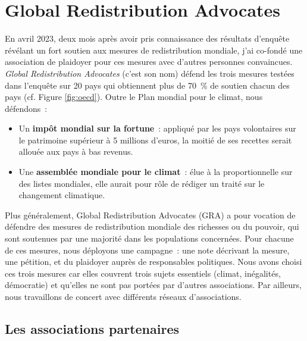 \documentclass[a5paper,french,openany]{memoir}
\begin{document}
\section{Global Redistribution Advocates}

En avril 2023, deux mois après avoir pris connaissance des résultats d'enquête révélant un fort soutien aux mesures de redistribution mondiale, j'ai co-fondé une association de plaidoyer pour ces mesures avec d'autres personnes convaincues. \textit{Global Redistribution Advocates} (c'est son nom) défend les trois mesures testées dans l'enquête sur 20 pays qui obtiennent plus de 70~\% de soutien chacun des pays (cf. Figure \ref{fig:oecd}). Outre le Plan mondial pour le climat, nous défendons~: 
\begin{itemize}
  \item Un \textbf{impôt mondial sur la fortune}~: appliqué par les pays volontaires sur le patrimoine supérieur à 5 millions d'euros, la moitié de ses recettes serait allouée aux pays à bas revenus.
  \item Une \textbf{assemblée mondiale pour le climat}~: élue à la proportionnelle sur des listes mondiales, elle aurait pour rôle de rédiger un traité sur le changement climatique.
\end{itemize}

Plus généralement, Global Redistribution Advocates (GRA) a pour vocation de défendre des mesures de redistribution mondiale des richesses ou du pouvoir, qui sont soutenues par une majorité dans les populations concernées. Pour chacune de ces mesures, nous déployons une campagne~: une note décrivant la mesure, une pétition, et du plaidoyer auprès de responsables politiques. Nous avons choisi ces trois mesures car elles couvrent trois sujets essentiels (climat, inégalités, démocratie) et qu'elles ne sont pas portées par d'autres associations. Par ailleurs, nous travaillons de concert avec différents réseaux d'associations. 

\subsection{Les associations partenaires}
\end{document}
